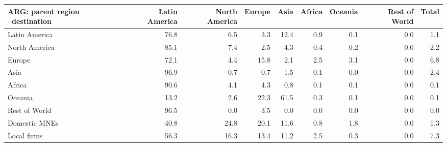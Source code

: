 \begin{tabular}{lrrrrrrrr}
\toprule
ARG: parent region \ destination & Latin America & North America & Europe & Asia & Africa & Oceania & Rest of World & Total \\
\midrule
Latin America & 76.8 & 6.5 & 3.3 & 12.4 & 0.9 & 0.1 & 0.0 & 1.1 \\
North America & 85.1 & 7.4 & 2.5 & 4.3 & 0.4 & 0.2 & 0.0 & 2.2 \\
Europe & 72.1 & 4.4 & 15.8 & 2.1 & 2.5 & 3.1 & 0.0 & 6.8 \\
Asia & 96.9 & 0.7 & 0.7 & 1.5 & 0.1 & 0.0 & 0.0 & 2.4 \\
Africa & 90.6 & 4.1 & 4.3 & 0.8 & 0.1 & 0.1 & 0.0 & 0.1 \\
Oceania & 13.2 & 2.6 & 22.3 & 61.5 & 0.3 & 0.1 & 0.0 & 0.1 \\
Rest of World & 96.5 & 0.0 & 3.5 & 0.0 & 0.0 & 0.0 & 0.0 & 0.0 \\
Domestic MNEs & 40.8 & 24.8 & 20.1 & 11.6 & 0.8 & 1.8 & 0.0 & 1.3 \\
Local firms & 56.3 & 16.3 & 13.4 & 11.2 & 2.5 & 0.3 & 0.0 & 7.3 \\
\bottomrule
\end{tabular}
